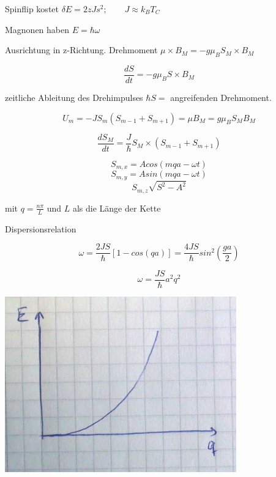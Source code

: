 Spinflip kostet \(\delta E = 2zJs^2; \qquad J\approx k_BT_C\)

Magnonen haben \(E = \hbar\omega\)

Ausrichtung in z-Richtung. Drehmoment \(\mu\times B_M = - g\mu_B S_M\times B_M\)

\[\frac{dS}{dt} = -g\mu_B S\times B_M\]

zeitliche Ableitung des Drehimpulses \(\hbar S =\) angreifenden Drehmoment.

\[U_m = -J S_m(S_{m-1}+S_{m+1}) = \mu B_M = g\mu_BS_MB_M\]

\[\frac{dS_M}{dt}= \frac{J}{\hbar}S_M\times (S_{m-1}+S_{m+1})\]

\[S_{m,x} = Acos(mqa-\omega t)\]
\[S_{m,y} = Asin(mqa-\omega t)\]
\[S_{m,z}\sqrt{S^2-A^2}\]


mit \(q= \frac{n\pi}{L}\) und \(L\) als die Länge der Kette

Dispersionsrelation

\[\omega = \frac{2JS}{\hbar}[1-cos(qa)] =\frac{4JS}{\hbar} sin^2(\frac{ga}{2}) \]

\[\omega = \frac{JS}{\hbar}a^2q^2\]

\includegraphics[width=0.75\textwidth]{kap12_12.png}
